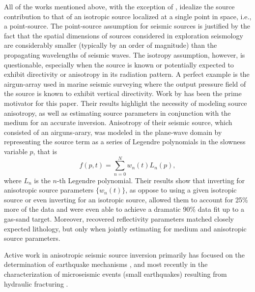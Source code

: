 All of the works mentioned above, with the exception of \cite{SymMink:97}, idealize the source contribution to that of an isotropic source localized at a single point in space, i.e., a point-source. 
The point-source assumption for seismic sources is justified by the fact that the spatial dimensions of sources considered in exploration seismology are considerably smaller (typically by an order of magnitude) than the propagating wavelengths of seismic waves. 
The isotropy assumption, however, is questionable, especially when the source is known or potentially expected to exhibit directivity or anisotropy in its radiation pattern. 
A perfect example is the airgun-array used in marine seismic surveying where the output pressure field of the source is known to exhibit vertical directivity. 
Work by \cite{SymMink:97} has been the prime motivator for this paper.
Their results highlight the necessity of modeling source anisotropy, as well as estimating source parameters in conjunction with the medium for an accurate inversion.
Anisotropy of their seismic source, which consisted of an airguns-arary, was modeled in the plane-wave domain by representing the source term as a series of Legendre polynomials in the slowness variable $p$, that is
\begin{equation}\label{eq:MPSradon}
	f(p,t) = \sum_{n=0}^N w_n(t)L_n(p),
\end{equation}
where $L_n$ is the $n$-th Legendre polynomial.
Their results show that inverting for anisotropic source parameters $\{w_n(t)\}$, as oppose to using a given isotropic source or even inverting for an isotropic source, allowed them to account for 25\% more of the data and were even able to achieve a dramatic 90\% data fit up to a gas-sand target.
Moreover, recovered reflectivity parameters matched closely expected lithology, but only when jointly estimating for medium and anisotropic source parameters.

Active work in anisotropic seismic source inversion primarily has focused on the determination of earthquake mechanisms \citep{Sipkin:82,Koch:91}, and most recently in the characterization of microseismic events (small earthquakes) resulting from hydraulic fracturing \citep{Song:11,Eaton:10}.


